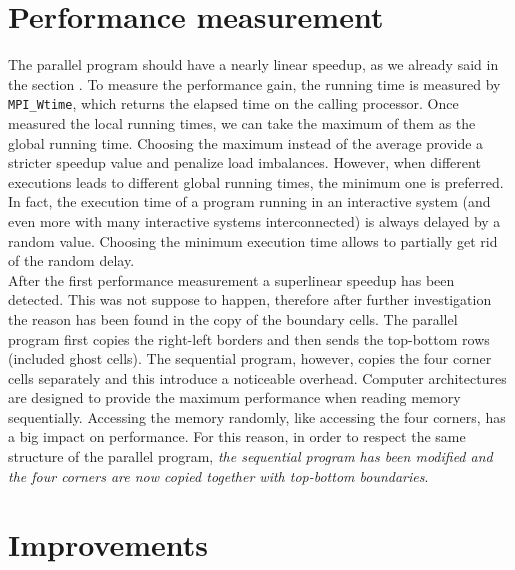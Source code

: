 \documentclass{article}
\begin{document}
\section{Performance measurement}
The parallel program should have a nearly linear speedup, as we already said in the section . To measure the performance gain, the running time is measured by \texttt{MPI\_Wtime}, which returns the elapsed time on the calling processor. Once measured the local running times, we can take the maximum of them as the global running time. Choosing the maximum instead of the average provide a stricter speedup value and penalize load imbalances. However, when different executions leads to different global running times, the minimum one is preferred. In fact, the execution time of a program running in an interactive system (and even more with many interactive systems interconnected) is always delayed by a random value. Choosing the minimum execution time allows to partially get rid of the random delay. \\
After the first performance measurement a superlinear speedup has been detected. This was not suppose to happen, therefore after further investigation the reason has been found in the copy of the boundary cells. The parallel program first copies the right-left borders and then sends the top-bottom rows (included ghost cells). The sequential program, however, copies the four corner cells separately and this introduce a noticeable overhead. Computer architectures are designed to provide the maximum performance when reading memory sequentially. Accessing the memory randomly, like accessing the four corners, has a big impact on performance. For this reason, in order to respect the same structure of the parallel program, \emph{the sequential program has been modified and the four corners are now copied together with top-bottom boundaries}.




\section{Improvements}
\end{document}
